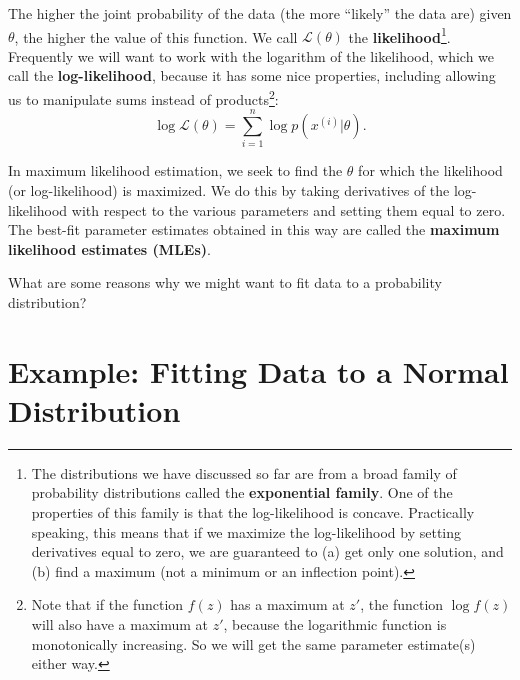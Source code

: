 The higher the joint probability of the data (the more ``likely'' the data are) given $\theta$, the higher the value of this function. We call $\mathcal{L}(\theta)$ the \textbf{likelihood}\footnote{The distributions we have discussed so far are from a broad family of probability distributions called the {\bf exponential family}. One of the properties of this family is that the log-likelihood is concave. Practically speaking, this means that if we maximize the log-likelihood by setting derivatives equal to zero, we are guaranteed to (a) get only one solution, and (b) find a maximum (not a minimum or an inflection point).}. Frequently we will want to work with the logarithm of the likelihood, which we call the \textbf{log-likelihood}, because it has some nice properties, including allowing us to manipulate sums instead of products\footnote{Note that if the function $f(z)$ has a maximum at $z'$, the function $\log f(z)$ will also have a maximum at $z'$, because the logarithmic function is monotonically increasing. So we will get the same parameter estimate(s) either way.}:
$$ \log \mathcal{L}(\theta) = \sum_{i=1}^n \log p(x^{(i)}|\theta). $$

In maximum likelihood estimation, we seek to find the $\theta$ for which the likelihood (or log-likelihood) is maximized. We do this by taking derivatives of the log-likelihood with respect to the various parameters and setting them equal to zero. The best-fit parameter estimates obtained in this way are called the \textbf{maximum likelihood estimates (MLEs)}. 
\vspace{5mm}

\begin{question}{}
What are some reasons why we might want to fit data to a probability distribution?
\end{question}

\section{Example: Fitting Data to a Normal Distribution}

